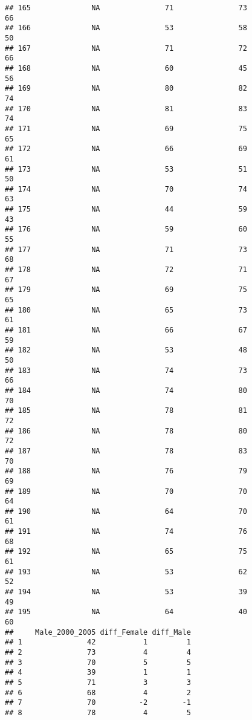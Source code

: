 \documentclass[]{article}
\begin{document}
\begin{verbatim}
## 165              NA               71               73             66
## 166              NA               53               58             50
## 167              NA               71               72             66
## 168              NA               60               45             56
## 169              NA               80               82             74
## 170              NA               81               83             74
## 171              NA               69               75             65
## 172              NA               66               69             61
## 173              NA               53               51             50
## 174              NA               70               74             63
## 175              NA               44               59             43
## 176              NA               59               60             55
## 177              NA               71               73             68
## 178              NA               72               71             67
## 179              NA               69               75             65
## 180              NA               65               73             61
## 181              NA               66               67             59
## 182              NA               53               48             50
## 183              NA               74               73             66
## 184              NA               74               80             70
## 185              NA               78               81             72
## 186              NA               78               80             72
## 187              NA               78               83             70
## 188              NA               76               79             69
## 189              NA               70               70             64
## 190              NA               64               70             61
## 191              NA               74               76             68
## 192              NA               65               75             61
## 193              NA               53               62             52
## 194              NA               53               39             49
## 195              NA               64               40             60
##     Male_2000_2005 diff_Female diff_Male
## 1               42           1         1
## 2               73           4         4
## 3               70           5         5
## 4               39           1         1
## 5               71           3         3
## 6               68           4         2
## 7               70          -2        -1
## 8               78           4         5

\end{verbatim}
\end{document}
